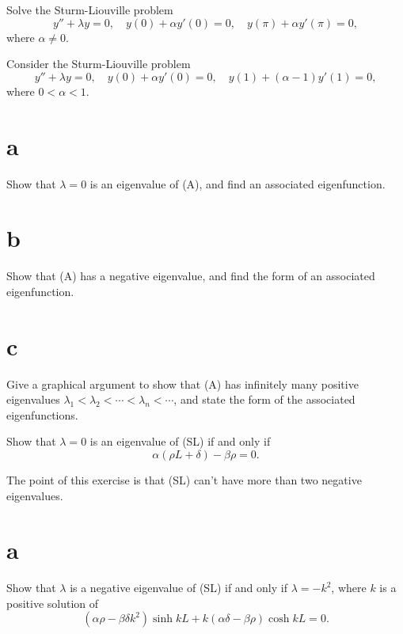 \begin{exerciselist}
  \item\label{exer:13.2.26} Solve the Sturm-Liouville problem
  \[
    y''+\lambda y=0,\quad y(0)+\alpha y'(0)=0,\quad y(\pi)+\alpha y'(\pi)=0,
  \]
  where $\alpha\ne0$.

  \item\label{exer:13.2.27}\Lex Consider the Sturm-Liouville problem
  \begin{equation}
    \tag{A}y''+\lambda y=0,\quad y(0)+\alpha y'(0)=0,\quad y(1)+(\alpha-1)y'(1)=0,
  \end{equation}
  where $0<\alpha<1$.

  \part{a} Show that $\lambda=0$ is an eigenvalue of (A), and find an associated eigenfunction.

  \part{b} Show that (A) has a negative eigenvalue, and find the form of an associated
  eigenfunction.

  \part{c} Give a graphical argument to show that (A) has infinitely many positive eigenvalues
  $\lambda_{1}<\lambda_{2}<\cdots <\lambda_{n}<\cdots$, and state the form of the associated
  eigenfunctions.


  \item\label{exer:13.2.28} Show that $\lambda=0$ is an eigenvalue of (SL) if and only if
  \[
    \alpha(\rho L+\delta)-\beta\rho=0.
  \]

  \item\label{exer:13.2.29} \Lex The point of this exercise is that (SL) can't have more than two
        negative eigenvalues.

  \part{a} Show that $\lambda$ is a negative eigenvalue of (SL) if and only if $\lambda=-k^{2}$,
  where $k$ is a positive solution of
  \[
    (\alpha\rho-\beta\delta k^{2})\sinh kL+k(\alpha\delta-\beta\rho)\cosh kL=0.
  \]


\end{exerciselist}
